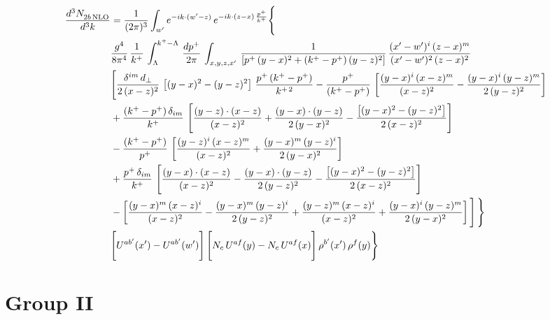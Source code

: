 \documentclass[9pt]{article}
\numberwithin{equation}{section}
\begin{document}
\begin{align}
 \frac{d^{3}N_{2b\,\rm NLO}^{\rm}}{d^{3}k}  & =   \frac{1}{(2\pi)^{3}}  \int_{ w^\prime} e^{-ik\cdot(w'-z)}\,e^{-ik\cdot (z-x)\,\frac{p^{+}}{k^{+}}} \Bigg\{\notag \\ & \frac{g^{4}}{8\pi^{4}}\,\frac{1}{k^{+}}\,\int_{\Lambda}^{k^{+}-\Lambda}\, \frac{dp^{+}}{2\pi} \, \int_{x,y,z,x'}\,\frac{1}{\left[p^{+}\,(y-x)^{2}+(k^{+}-p^{+})\,(y-z)^{2}\right]}\, \frac{(x'-w')^{i}\,(z-x)^{m}}{(x'-w')^{2}\,(z-x)^{2}} \notag \\ & \Bigg[\frac{\delta^{im}\,d_{\perp}}{2\,(x-z)^{2}}\,\left[(y-x)^{2}-(y-z)^{2}\right]\,\frac{p^{+}\,(k^{+}-p^{+})}{k^{+\,2}}-\frac{p^{+}}{(k^{+}-p^{+})}\,\left[\frac{(y-x)^{i}\,(x-z)^{m}}{(x-z)^{2}}-\frac{(y-x)^{i}\,(y-z)^{m}}{2\,(y-z)^{2}}\right]\notag \\ & +\frac{(k^{+}-p^{+})\,\delta_{im}}{k^{+}}\,\left[\frac{(y-z)\cdot (x-z)}{(x-z)^{2}}+\frac{(y-x)\cdot (y-z)}{2\,(y-x)^{2}}-\frac{\left[(y-x)^{2}-(y-z)^{2}\right]}{2\,(x-z)^{2}}\right]\notag \\ & -\frac{(k^{+}-p^{+})}{p^{+}}\,\left[\frac{(y-z)^{i}\,(x-z)^{m}}{(x-z)^{2}}+\frac{(y-x)^{m}\,(y-z)^{i}}{2\,(y-x)^{2}}\right]\notag \\ & +\frac{p^{+}\,\delta_{im}}{k^{+}}\,\left[\frac{(y-x)\cdot (x-z)}{(x-z)^{2}}-\frac{(y-x)\cdot (y-z)}{2\,(y-z)^{2}}-\frac{\left[(y-x)^{2}-(y-z)^{2}\right]}{2\,(x-z)^{2}}\right]\notag \\ &-\left[\frac{(y-x)^{m}\,(x-z)^{i}}{(x-z)^{2}}-\frac{(y-x)^{m}\,(y-z)^{i}}{2\,(y-z)^{2}}+\frac{(y-z)^{m}\,(x-z)^{i}}{(x-z)^{2}}+\frac{(y-x)^{i}\,(y-z)^{m}}{2\,(y-x)^{2}}\right]\Bigg]\,\Bigg\} \notag \\ & \Bigg[U^{ab'}(x')-U^{ab'}(w')\Bigg]\,\Bigg[N_{c}\,U^{af}(y) -N_{c}\,U^{af}(x)\Bigg]\,\rho^{b'}(x')\,\rho^{f}(y)\Bigg\}
\end{align}
\section{Group II}
\end{document}
